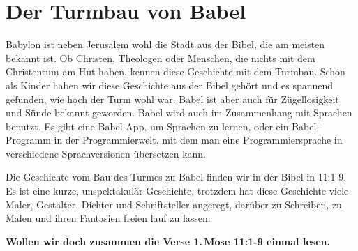 \documentclass[fontsize=16pt]{mybib}
\title{\biblezit{IIPetr}{3:1-8}}
\author{Lothar Schmid}
\date{}
\begin{document}
\section{Der Turmbau von Babel}
    \begin{otsblock}[Einleitung]
    Babylon ist neben Jerusalem wohl die Stadt aus der Bibel, die am meisten bekannt ist. Ob Christen, Theologen oder Menschen, die nichts mit dem Christentum am Hut haben, kennen diese Geschichte mit dem Turmbau. Schon als Kinder haben wir diese Geschichte aus der Bibel gehört und es spannend gefunden, wie hoch der Turm wohl war. Babel ist aber auch für Zügellosigkeit und Sünde bekannt geworden. Babel wird auch im Zusammenhang mit Sprachen benutzt. Es gibt eine Babel-App, um Sprachen zu lernen, oder ein Babel-Programm in der Programmierwelt, mit dem man eine Programmiersprache in verschiedene Sprachversionen übersetzen kann.
    \end{otsblock}
    \begin{otsblock}
    Die Geschichte vom Bau des Turmes zu Babel finden wir in der Bibel in  {11:1-9}. Es ist eine kurze, unspektakulär Geschichte, trotzdem hat diese Geschichte viele Maler, Gestalter, Dichter und Schriftsteller angeregt, darüber zu Schreiben, zu Malen und ihren Fantasien freien lauf zu lassen. 
    \end{otsblock}

    \textbf{Wollen wir doch zusammen die Verse 1.\,Mose 11:1-9 einmal lesen.}
    
\end{document}
